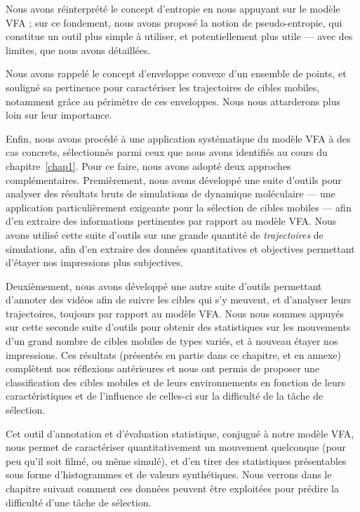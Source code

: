 	Nous avons réinterprété le concept d'entropie en nous appuyant sur le modèle VFA ; sur ce fondement, nous avons proposé la notion de pseudo-entropie, qui constitue un outil plus simple à utiliser, et potentiellement plus utile --- avec des limites, que nous avons détaillées.	
	
	Nous avons rappelé le concept d'enveloppe convexe d'un ensemble de points, et souligné sa pertinence pour caractériser les trajectoires de cibles mobiles, notamment grâce au périmètre de ces enveloppes. Nous nous attarderons plus loin sur leur importance.
	
	Enfin, nous avons procédé à une application systématique du modèle VFA à des cas concrets, sélectionnés parmi ceux que nous avons identifiés au cours du chapitre~\ref{chap1}. Pour ce faire, nous avons adopté deux approches complémentaires. Premièrement, nous avons développé une suite d'outils pour analyser des résultats bruts de simulations de dynamique moléculaire --- une application particulièrement exigeante pour la sélection de cibles mobiles --- afin d'en extraire des informations pertinentes par rapport au modèle VFA. Nous avons utilisé cette suite d'outils sur une grande quantité de \emph{trajectoires} de simulations, afin d'en extraire des données quantitatives et objectives permettant d'étayer nos impressions plus subjectives.
	
	Deuxièmement, nous avons développé une autre suite d'outils permettant d'annoter des vidéos afin de suivre les cibles qui s'y meuvent, et d'analyser leurs trajectoires, toujours par rapport au modèle VFA. Nous nous sommes appuyés sur cette seconde suite d'outils pour obtenir des statistiques sur les mouvements d'un grand nombre de cibles mobiles de types variés, et à nouveau étayer nos impressions. Ces résultats (présentés en partie dans ce chapitre, et en annexe) complètent nos réflexions antérieures et nous ont permis de proposer une classification des cibles mobiles et de leurs environnements en fonction de leurs caractéristiques et de l'influence de celles-ci sur la difficulté de la tâche de sélection.
	
	Cet outil d'annotation et d'évaluation statistique, conjugué à notre modèle VFA, nous permet de caractériser quantitativement un mouvement quelconque (pour peu qu'il soit filmé, ou même simulé), et d'en tirer des statistiques présentables sous forme d'histogrammes et de valeurs synthétiques. Nous verrons dans le chapitre suivant comment ces données peuvent être exploitées pour prédire la difficulté d'une tâche de sélection.